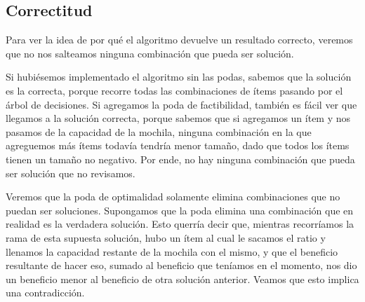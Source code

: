 \documentclass[10pt, a4paper]{article}
\begin{document}

\subsection{Correctitud}
Para ver la idea de por qué el algoritmo devuelve un resultado correcto, veremos que no nos salteamos ninguna combinación que pueda ser solución.\par
Si hubiésemos implementado el algoritmo sin las podas, sabemos que la solución es la correcta, porque recorre todas las combinaciones de ítems pasando por el árbol de decisiones. Si agregamos la poda de factibilidad, también es fácil ver que llegamos a la solución correcta, porque sabemos que si agregamos un ítem y nos pasamos de la capacidad de la mochila, ninguna combinación en la que agreguemos más ítems todavía tendría menor tamaño, dado que todos los ítems tienen un tamaño no negativo. Por ende, no hay ninguna combinación que pueda ser solución que no revisamos.\par
Veremos que la poda de optimalidad solamente elimina combinaciones que no puedan ser soluciones. Supongamos que la poda elimina una combinación que en realidad es la verdadera solución. Esto querría decir que, mientras recorríamos la rama de esta supuesta solución, hubo un ítem al cual le sacamos el ratio y llenamos la capacidad restante de la mochila con el mismo, y que el beneficio resultante de hacer eso, sumado al beneficio que teníamos en el momento, nos dio un beneficio menor al beneficio de otra solución anterior. Veamos que esto implica una contradicción.\par
\end{document}
